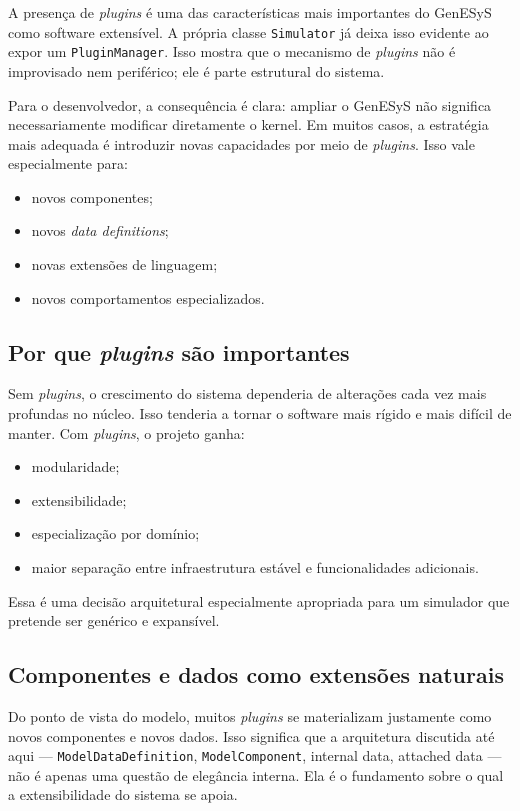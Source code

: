 A presença de \textit{plugins} é uma das características mais importantes do GenESyS como software extensível. A própria classe \texttt{Simulator} já deixa isso evidente ao expor um \texttt{PluginManager}. Isso mostra que o mecanismo de \textit{plugins} não é improvisado nem periférico; ele é parte estrutural do sistema.

Para o desenvolvedor, a consequência é clara: ampliar o GenESyS não significa necessariamente modificar diretamente o kernel. Em muitos casos, a estratégia mais adequada é introduzir novas capacidades por meio de \textit{plugins}. Isso vale especialmente para:
\begin{itemize}
    \item novos componentes;
    \item novos \textit{data definitions};
    \item novas extensões de linguagem;
    \item novos comportamentos especializados.
\end{itemize}

\subsection{Por que \textit{plugins} são importantes}
\label{subsec:cap8_por_que_plugins_importantes}

Sem \textit{plugins}, o crescimento do sistema dependeria de alterações cada vez mais profundas no núcleo. Isso tenderia a tornar o software mais rígido e mais difícil de manter. Com \textit{plugins}, o projeto ganha:
\begin{itemize}
    \item modularidade;
    \item extensibilidade;
    \item especialização por domínio;
    \item maior separação entre infraestrutura estável e funcionalidades adicionais.
\end{itemize}

Essa é uma decisão arquitetural especialmente apropriada para um simulador que pretende ser genérico e expansível.

\subsection{Componentes e dados como extensões naturais}
\label{subsec:cap8_componentes_dados_extensoes_naturais}

Do ponto de vista do modelo, muitos \textit{plugins} se materializam justamente como novos componentes e novos dados. Isso significa que a arquitetura discutida até aqui — \texttt{ModelDataDefinition}, \texttt{ModelComponent}, internal data, attached data — não é apenas uma questão de elegância interna. Ela é o fundamento sobre o qual a extensibilidade do sistema se apoia.

